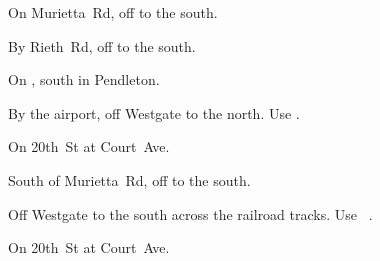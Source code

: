 
\begin{LocationList}

On Murietta~Rd, off   to the south.

By Rieth~Rd, off   to the south.

\Location{\GasStation \Gas}
On , south in Pendleton.

By the airport, off  Westgate to the north. Use  .

On 20th~St at Court~Ave.

South of Murietta~Rd, off   to the south.

Off  Westgate to the south across the railroad tracks. Use~ .

On 20th~St at Court~Ave.

\end{LocationList}
